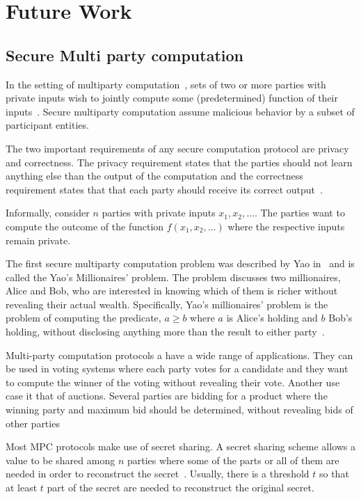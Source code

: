 \chapter{Future Work}
\label{future_work}

\section{Secure Multi party computation}
\label{future_work:mpc}

In the setting of multiparty computation~\cite{Ben-Or:1988:CTN:62212.62213}, sets of two or more parties with private inputs wish to jointly compute some (predetermined) function of their inputs~\cite{mpc}. Secure multiparty computation assume malicious behavior by a subset of participant entities.

The two important requirements of any secure computation protocol are privacy and correctness. The privacy requirement states that the parties should not learn anything else than the output of the computation and the correctness requirement states that that each party should receive its correct output~\cite{mpc}.

Informally, consider $n$ parties with private inputs $x_1, x_2, \dots$. The parties want to compute the outcome of the function $f(x_1, x_2, \dots)$ where the respective inputs remain private.

The first secure multiparty computation problem was described by Yao in~\cite{Yao:1982:PSC:1398511.1382751} and is called the Yao's Millionaires' problem. The problem discusses two millionaires, Alice and Bob, who are interested in knowing which of them is richer without revealing their actual wealth. Specifically, Yao’s millionaires’ problem is the problem of computing the predicate, $a \geq b$ where $a$ is Alice's holding and $b$ Bob's holding, without disclosing anything more than the result to either party~\cite{mpc_ioannidis}.

Multi-party computation protocols a have a wide range of applications. They can be used in voting systems where each party votes for a candidate and they want to compute the winner of the voting without revealing their vote. Another use case it that of auctions. Several parties are bidding for a product where the winning party and maximum bid should be determined, without revealing bids of other parties

Most MPC protocols make use of secret sharing. A secret sharing scheme allows a value to be shared among $n$ parties where some of the parts or all of them are needed in order to reconstruct the secret~\cite{Kamm:2015:ASM:2836836}. Usually, there is a threshold $t$ so that at least $t$ part of the secret are needed to reconstruct the original secret.

